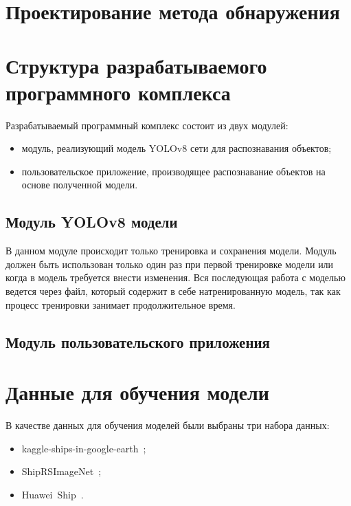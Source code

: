 \section{Проектирование метода обнаружения}



\section{Структура разрабатываемого программного комплекса}

Разрабатываемый программный комплекс состоит из двух модулей:
\begin{itemize}[label=---]
    \item модуль, реализующий модель YOLOv8 сети для распознавания объектов;
    \item пользовательское приложение, производящее распознавание объектов на основе полученной модели.
\end{itemize}

\subsection{Модуль YOLOv8 модели}

В данном модуле происходит только тренировка и сохранения модели. Модуль должен быть использован только один раз при первой тренировке модели или когда в модель требуется внести изменения. Вся последующая работа с моделью ведется через файл, который содержит в себе натренированную модель, так как процесс тренировки занимает продолжительное время.

\subsection{Модуль пользовательского приложения}

\section{Данные для обучения модели}

В качестве данных для обучения моделей были выбраны три набора данных:
\begin{itemize}[label=---]
    \item kaggle-ships-in-google-earth~\cite{kaggle-ships-in-google-earth-dfqwt_dataset};
    \item ShipRSImageNet~\cite{shiprs-imagenet};
    \item Huawei~Ship~\cite{huawei_ship_dataset}.
\end{itemize}

